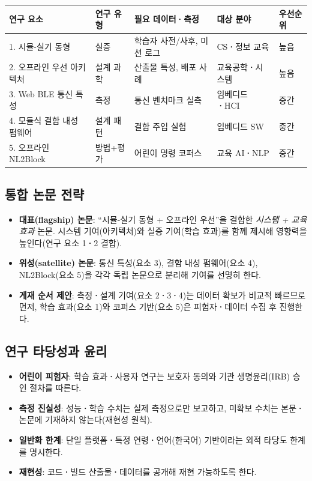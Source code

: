 \begin{longtable}{L{3.0cm} L{2.6cm} L{3.4cm} L{2.4cm} L{1.6cm}}
\toprule
{}\textbf{연구 요소} & \textbf{연구 유형} & \textbf{필요 데이터\textbf{·}측정} & \textbf{대상 분야} & \textbf{우선순위} \\
\midrule
{}. 시뮬-실기 동형 & 실증 & 학습자 사전/사후, 미션 로그 & CS\textbf{·}정보 교육 & 높음 \\
2. 오프라인 우선 아키텍처 & 설계 과학 & 산출물 특성, 배포 사례 & 교육공학\textbf{·}시스템 & 높음 \\
3. Web BLE 통신 특성 & 측정 & 통신 벤치마크 실측 & 임베디드\textbf{·}HCI & 중간 \\
4. 모듈식 결함 내성 펌웨어 & 설계 패턴 & 결함 주입 실험 & 임베디드 SW & 중간 \\
5. 오프라인 NL2Block & 방법+평가 & 어린이 명령 코퍼스 & 교육 AI\textbf{·}NLP & 중간 \\
\bottomrule
\end{longtable}

\subsection{통합 논문 전략}

\begin{itemize}
  \item \textbf{대표(flagship) 논문}: ``시뮬-실기 동형 + 오프라인 우선''을 결합한
        \emph{시스템 + 교육 효과} 논문. 시스템 기여(아키텍처)와 실증 기여(학습 효과)를
        함께 제시해 영향력을 높인다(연구 요소 1\textbf{·}2 결합).
  \item \textbf{위성(satellite) 논문}: 통신 특성(요소 3), 결함 내성 펌웨어(요소 4),
        NL2Block(요소 5)을 각각 독립 논문으로 분리해 기여를 선명히 한다.
  \item \textbf{게재 순서 제안}: 측정\textbf{·}설계 기여(요소 2\textbf{·}3\textbf{·}4)는 데이터
        확보가 비교적 빠르므로 먼저, 학습 효과(요소 1)와 코퍼스 기반(요소 5)은
        피험자\textbf{·}데이터 수집 후 진행한다.
\end{itemize}

\subsection{연구 타당성과 윤리}

\begin{infobox}[title=타당성\textbf{·}윤리 점검]
\begin{itemize}
  \item \textbf{어린이 피험자}: 학습 효과\textbf{·}사용자 연구는 보호자 동의와 기관
        생명윤리(IRB) 승인 절차를 따른다.
  \item \textbf{측정 진실성}: 성능\textbf{·}학습 수치는 실제 측정으로만 보고하고, 미확보
        수치는 본문\textbf{·}논문에 기재하지 않는다(재현성 원칙).
  \item \textbf{일반화 한계}: 단일 플랫폼\textbf{·}특정 연령\textbf{·}언어(한국어) 기반이라는
        외적 타당도 한계를 명시한다.
  \item \textbf{재현성}: 코드\textbf{·}빌드 산출물\textbf{·}데이터를 공개해 재현 가능하도록 한다.
\end{itemize}
\end{infobox}

